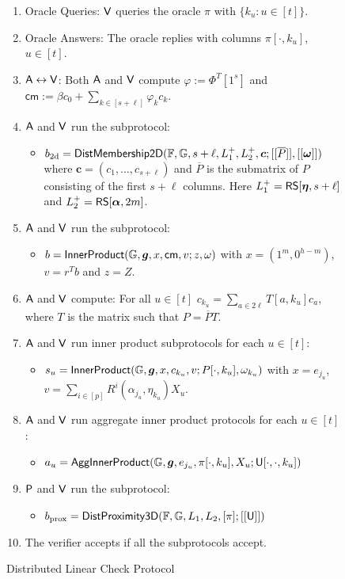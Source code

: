 \begin{figure}[h!]
\begin{framed}
\begin{itemize}
\begin{enumerate}[{\rm 1.}]
\item Oracle Queries: $\mathsf{V}$ queries the oracle $\pi$ with $\{k_u:u\in
[t]\}$. 
\item Oracle Answers: The oracle replies with columns $\pi[\cdot,k_u]$, $u\in
[t]$.
\item $\mathsf{A}\leftrightarrow\mathsf{V}$: Both $\mathsf{A}$ and $\mathsf{V}$
compute $\varphi := \Phi^T[1^s]$ and $\mathsf{cm} := \beta c_0 + \sum_{k\in
[s+\ell]}\varphi_kc_k$.
\item $\mathsf{A}$ and $\mathsf{V}$ run the subprotocol:
	\begin{itemize}
	\item $b_{\rm 2d} =
\mathsf{DistMembership2D}(\mathbb{F},\mathbb{G},s+\ell,L^{+}_1,L^{+}_2,\bm{c};[[\overline{P}]],[[\bm{\omega}]])$
where $\bm{c}=(c_1,\ldots,c_{s+\ell})$ and $\overline{P}$ is the submatrix of $P$
consisting of the first $s+\ell$ columns. Here $L^{+}_1=\mathsf{RS}[\bm{\eta},s+\ell]$ and
$L^{+}_2=\mathsf{RS}[\bm{\alpha},2m]$.
	\end{itemize}
\item $\mathsf{A}$ and $\mathsf{V}$ run the subprotocol:
	\begin{itemize}
	\item $b = \mathsf{InnerProduct}(\mathbb{G},\bm{g},x,\mathsf{cm},v;z,\omega)$
with $x=(1^m,0^{h-m})$, $v=r^Tb$ and $z=Z$.
	\end{itemize}
\item $\mathsf{A}$ and $\mathsf{V}$ compute: For all $u\in [t]$ $c_{k_u} =
\sum_{a\in 2\ell}T[a,k_u]c_a$, where $T$ is the matrix such that $P=\overline{P}T$.
\item $\mathsf{A}$ and $\mathsf{V}$ run inner product subprotocols for each $u\in
[t]$:
	\begin{itemize}
	\item
$s_u=\mathsf{InnerProduct}(\mathbb{G},\bm{g},x,c_{k_u},v;P[\cdot,k_u],\omega_{k_u})$ with
$x=e_{j_u}$, $v=\sum_{i\in [p]}R^i(\alpha_{j_u},\eta_{k_u})X_u$.
	\end{itemize}
\item $\mathsf{A}$ and $\mathsf{V}$ run aggregate inner product protocols for each
$u\in [t]$:
	\begin{itemize}
	\item
$a_u=\mathsf{AggInnerProduct}(\mathbb{G},\bm{g},e_{j_u},\pi[\cdot,k_u],X_u;\mathsf{U}[\cdot,\cdot,k_u])$
	\end{itemize}
\item $\mathsf{P}$ and $\mathsf{V}$ run the subprotocol: 
	\begin{itemize}
	\item $b_{\rm prox} =
\mathsf{DistProximity3D}(\mathbb{F},\mathbb{G},L_1,L_2,[\pi];[[\mathsf{U}]])$
	\end{itemize}
\item The verifier accepts if all the subprotocols accept.
\end{enumerate}
\end{itemize}
\end{framed}
\caption{Distributed Linear Check Protocol}
\label{fig:distlincheck}
\end{figure}


